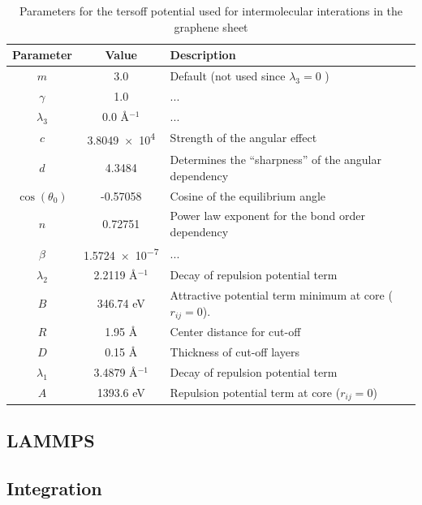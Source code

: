 \begin{table}[H]
  \begin{center}
  \caption{Parameters for the tersoff potential used for intermolecular interations in the graphene sheet}
  \label{tab:tersoff_param}
  \begin{tabular}{ | c | c | L{9cm} |} \hline
    Parameter & Value & Description \\ \hline 
    $m$ & 3.0 & Default (not used since $\lambda_3 = 0$ ) \\ \hline
    $\gamma$ & 1.0 & ... \\ \hline
    $\lambda_3$ & 0.0 Å$^{-1}$ & ... \\ \hline
    $c$ & \num{3.8049e4} & Strength of the angular effect \\ \hline
    $d$ & 4.3484 & Determines the ``sharpness'' of the angular dependency \\ \hline
    $\cos{(\theta_0)}$ & -0.57058 & Cosine of the equilibrium angle \\ \hline
    $n$ & 0.72751 & Power law exponent for the bond order dependency \\ \hline
    $\beta$ & \num{1.5724e-7} & ... \\ \hline
    $\lambda_2$ & 2.2119 Å$^{-1}$ & Decay of repulsion potential term \\ \hline
    $B$ & 346.74 eV & Attractive potential term minimum at core ($ r_{ij} = 0$).  \\ \hline
    $R$ & 1.95 Å & Center distance for cut-off \\ \hline
    $D$  & 0.15 Å & Thickness of cut-off layers \\ \hline
    $\lambda_1$ & 3.4879 Å$^{-1}$ & Decay of repulsion potential term \\ \hline
    $A$ & 1393.6 eV & Repulsion potential term at core ($ r_{ij} = 0$) \\ \hline
  \end{tabular}
  \end{center}
\end{table}



\subsection{LAMMPS}
\subsection{Integration}

